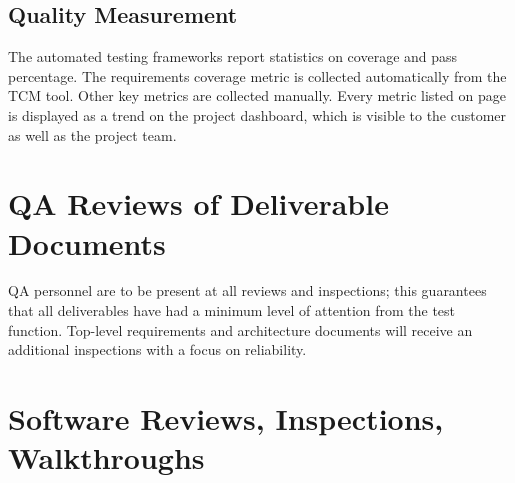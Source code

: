 \documentclass[11pt]{wacomepd}
\begin{document}
\section{Quality Measurement}
The automated testing frameworks report statistics on coverage and pass percentage.  The
requirements coverage metric is collected automatically from the TCM tool.  Other key metrics are
collected manually.  Every metric listed on page \pageref{metrics} is displayed as a trend on the
project dashboard, which is visible to the customer as well as the project team.


\chapter{QA Reviews of Deliverable Documents}

QA personnel are to be present at all reviews and inspections; this guarantees that all deliverables
have had a minimum level of attention from the test function.  Top-level requirements and
architecture documents will receive an additional inspections with a focus on reliability.



\chapter{Software Reviews, Inspections, Walkthroughs}
\end{document}
